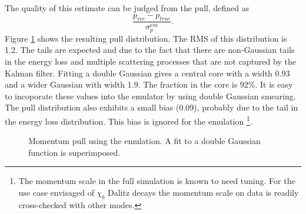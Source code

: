 The quality of this estimate can be judged from the pull, defined as 
\begin{equation*}
\frac{p_{rec} - p_{true}}{\sigma^{em}_{p}}.
\end{equation*}
Figure \ref{fig:ppull} shows the resulting pull distribution. The RMS of this
distribution is 1.2. The tails are expected and due to the fact that there are
non-Gaussian tails in the energy loss and multiple scattering
processes that are not captured by the Kalman filter. Fitting a double
Gaussian gives a central core with a width 0.93 and a wider Gaussian
with width 1.9. The fraction in the core is $92 \%$. It is easy to
incoporate these values into the emulator by using double Gaussian
smearing.  The pull distribution
also exhibits a small bias (0.09), probably due to the tail in the energy loss
distribution. This bias is ignored for the emulation \footnote{The
  momentum scale in the full simulation is known to need tuning. For
  the use case envisaged of $\chi_{b}$ Dalitz decays the momentum
  scale on data is readily cross-checked with other modes.}.
%
\begin{figure}[htb!]
\begin{center}
\caption{\small Momentum pull using the emulation. A fit to a double
  Gaussian function is superimposed.}
\label{fig:ppull}
\end{center}
\end{figure}
